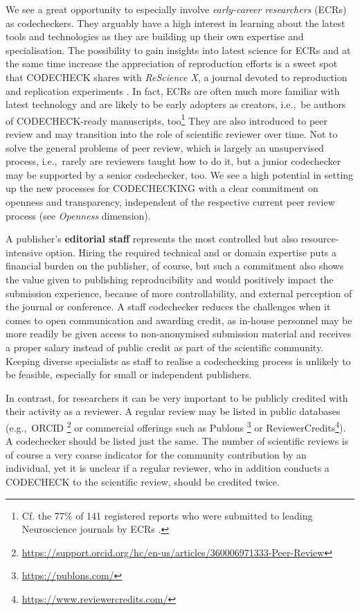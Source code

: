 \documentclass[12pt]{article}
\begin{document}
We see a great opportunity to especially involve
\emph{early-career researchers}
(ECRs) as codecheckers. They arguably have a high interest in learning
about the latest tools and technologies as they are building up their own
expertise and specialisation. The possibility to gain insights into latest
science for ECRs and at the same time increase the appreciation of
reproduction efforts is a sweet spot that CODECHECK shares
with \emph{ReScience X}, a journal devoted to reproduction and replication 
experiments \cite{roesch_new_2020}.
In fact, ECRs are often much more familiar with latest technology and are 
likely to be early adopters as creators, i.e.,~be authors of CODECHECK-ready manuscripts, too\footnote{Cf. the 77\% of 141 registered reports who were 
submitted to leading Neuroscience journals by ECRs
\cite{chambers_registered_2019}.}
They are also introduced to peer review and 
may transition into the role of scientific reviewer over time.
Not to solve the general problems of peer review, which is largely an
unsupervised process, i.e.,~rarely are reviewers taught how to do it, but
a junior codechecker may be supported by a senior codechecker, too.
We see a high potential in setting up the new processes for CODECHECKING with
a clear commitment on openness and transparency, independent of the
respective current peer review process (see \emph{Openness} dimension).

A publisher's \textbf{editorial staff} represents the most controlled but also
resource-intensive
option. Hiring the required technical and or domain expertise puts a financial
burden on the publisher, of course, but such a commitment also shows the 
value given to publishing reproducibility and would positively impact the 
submission experience, because of more controllability, and external 
perception of the journal or conference. A staff codechecker reduces the 
challenges when it comes to open communication and awarding credit, as
in-house personnel may be more readily be given access to non-anonymised
submission material and receives a proper salary instead of public credit
as part of the scientific community.
Keeping diverse specialists as staff to realise a codechecking process is 
unlikely to be feasible, especially for small or independent publishers.

In contrast, for researchers it can be very important to be publicly credited
with their activity as a reviewer.
A regular
review may be listed in public databases (e.g.,~ORCID
\footnote{\href{https://support.orcid.org/hc/en-us/articles/360006971333-Peer-Review}{https://support.orcid.org/hc/en-us/articles/360006971333-Peer-Review}} or commercial offerings such as Publons
\footnote{\href{https://publons.com/}{https://publons.com/}} or 
ReviewerCredits\footnote{\href{https://www.reviewercredits.com/}{https://www.reviewercredits.com/}}).
A codechecker should be listed just the same. The number of scientific reviews
is of course a very coarse indicator for the community contribution by an 
individual, yet it is unclear if a regular reviewer, who in addition
conducts a CODECHECK to the scientific review, should be credited twice.
\end{document}
